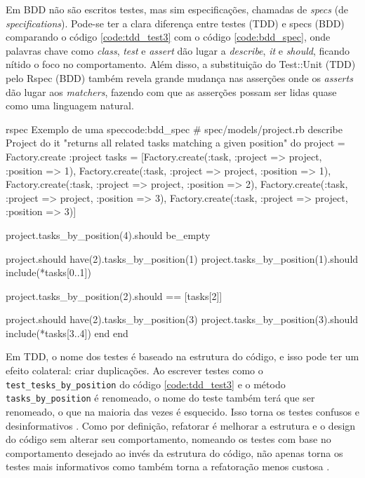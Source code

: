 Em BDD não são escritos testes, mas sim especificações, chamadas de \textit{specs} (de \textit{specifications}). Pode-se ter a clara diferença entre testes (TDD) e specs (BDD) comparando o código \ref{code:tdd_test3} com o código \ref{code:bdd_spec}, onde palavras chave como \textit{class}, \textit{test} e \textit{assert} dão lugar a \textit{describe}, \textit{it} e \textit{should}, ficando nítido o foco no comportamento. Além disso, a substituição do Test::Unit (TDD) pelo Rspec (BDD) também revela grande mudança nas asserções onde os \textit{asserts} dão lugar aos \textit{matchers}, fazendo com que as asserções possam ser lidas quase como uma linguagem natural.

\begin{mycode}{rspec}%
{Exemplo de uma spec}{code:bdd_spec}
# spec/models/project.rb
describe Project do
  it "returns all related tasks matching a given position" do
    project = Factory.create :project
    tasks = [Factory.create(:task, :project => project, :position => 1),
             Factory.create(:task, :project => project, :position => 1),
             Factory.create(:task, :project => project, :position => 2),
             Factory.create(:task, :project => project, :position => 3),
             Factory.create(:task, :project => project, :position => 3)]

    project.tasks_by_position(4).should be_empty

    project.should have(2).tasks_by_position(1)
    project.tasks_by_position(1).should include(*tasks[0..1])

    project.tasks_by_position(2).should == [tasks[2]]

    project.should have(2).tasks_by_position(3)
    project.tasks_by_position(3).should include(*tasks[3..4])
  end
end
\end{mycode}

Em TDD, o nome dos testes é baseado na estrutura do código, e isso pode ter um efeito colateral: criar duplicações. Ao escrever testes como o \texttt{test\_tesks\_by\_position} do código \ref{code:tdd_test3} e o método \texttt{tasks\_by\_position} é renomeado, o nome do teste também terá que ser renomeado, o que na maioria das vezes é esquecido. Isso torna os testes confusos e desinformativos \cite{ContinuousTesting}. Como por definição, refatorar é melhorar a estrutura e o design do código sem alterar seu comportamento, nomeando os testes com base no comportamento desejado ao invés da estrutura do código, não apenas torna os testes mais informativos como também torna a refatoração menos custosa \cite{ContinuousTesting}.

